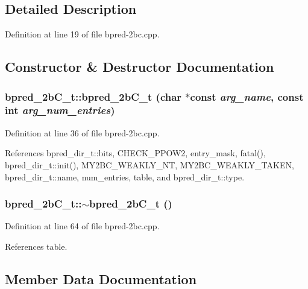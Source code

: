\subsection{Detailed Description}


Definition at line 19 of file bpred-2bc.cpp.

\subsection{Constructor \& Destructor Documentation}
\subsubsection[{bpred\_\-2bC\_\-t}]{\setlength{\rightskip}{0pt plus 5cm}bpred\_\-2bC\_\-t::bpred\_\-2bC\_\-t (char $\ast$const  {\em arg\_\-name}, \/  const int {\em arg\_\-num\_\-entries})\hspace{0.3cm}{\tt  [inline]}}\label{classbpred__2bC__t_bfb9726a701952e451b1899d3e398e2c}




Definition at line 36 of file bpred-2bc.cpp.

References bpred\_\-dir\_\-t::bits, CHECK\_\-PPOW2, entry\_\-mask, fatal(), bpred\_\-dir\_\-t::init(), MY2BC\_\-WEAKLY\_\-NT, MY2BC\_\-WEAKLY\_\-TAKEN, bpred\_\-dir\_\-t::name, num\_\-entries, table, and bpred\_\-dir\_\-t::type.
\subsubsection[{$\sim$bpred\_\-2bC\_\-t}]{\setlength{\rightskip}{0pt plus 5cm}bpred\_\-2bC\_\-t::$\sim$bpred\_\-2bC\_\-t ()\hspace{0.3cm}{\tt  [inline]}}\label{classbpred__2bC__t_92a5f8fd54935cb528e287d67bb1a349}




Definition at line 64 of file bpred-2bc.cpp.

References table.

\subsection{Member Data Documentation}
